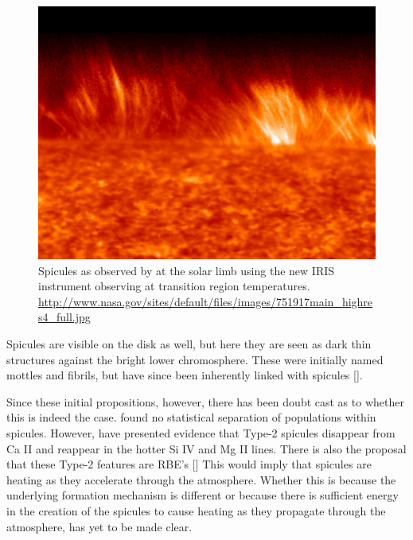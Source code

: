 \begin{figure}
	\centering
	\includegraphics[scale=0.4]{Chapter2/Figs/spicules_at_limb}
	\caption{Spicules as observed by at the solar limb using the new IRIS instrument observing at transition region temperatures.
		\url{http://www.nasa.gov/sites/default/files/images/751917main_highres4_full.jpg}}
\end{figure}

Spicules are visible on the disk as well, but here they are seen as dark thin structures against the bright lower chromosphere.
These were initially named mottles and fibrils, but have since been inherently linked with spicules [\cite{DePontieu2007MF, Rouppe2009}].

Since these initial propositions, however, there has been doubt cast as to whether this is indeed the case. 
\cite{Zhang2012} found no statistical separation of populations within spicules.
However, \cite{Pereira2014} have presented evidence that Type-2 spicules disappear from Ca II and reappear in the hotter Si IV and Mg II lines.
There is also the proposal that these Type-2 features are RBE's [\cite{Kuridze2015, Rouppe2015}]
This would imply that spicules are heating as they accelerate through the atmosphere.
Whether this is because the underlying formation mechanism is different or because there is sufficient energy in the creation of the spicules to cause heating as they propagate through the atmosphere, has yet to be made clear. 

